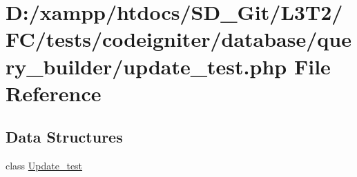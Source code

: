\hypertarget{tests_2codeigniter_2database_2query__builder_2update__test_8php}{}\section{D\+:/xampp/htdocs/\+S\+D\+\_\+\+Git/\+L3\+T2/\+F\+C/tests/codeigniter/database/query\+\_\+builder/update\+\_\+test.php File Reference}
\label{tests_2codeigniter_2database_2query__builder_2update__test_8php}
\subsection*{Data Structures}
\begin{DoxyCompactItemize}
\item 
class \hyperlink{class_update__test}{Update\+\_\+test}
\end{DoxyCompactItemize}
